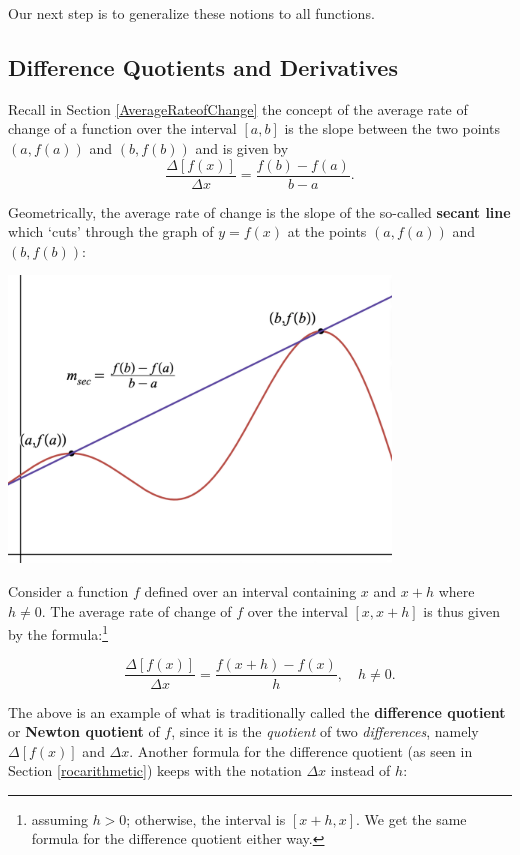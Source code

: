 \documentclass{ximera}
\begin{document}
Our next step is to generalize these notions to all functions.


\subsection{Difference Quotients and Derivatives}
\label{diffquotderiv}


Recall  in Section \ref{AverageRateofChange} the concept of the average rate of change of a function over the interval $[a,b]$  is the slope between the two points $(a, f(a))$ and $(b, f(b))$ and is given by \[ \dfrac{\Delta[f(x)]}{\Delta x} = \dfrac{f(b)-f(a)}{b-a}.\]

Geometrically, the average rate of change is the slope of the so-called \textbf{secant line} which `cuts' through the graph of $y = f(x)$ at the points $(a,f(a))$ and $(b, f(b))$:

\begin{center}
\includegraphics[width=4in]{./IntroductiontoDerivativesGraphics/SecantLine.png}
\end{center}

Consider a function $f$ defined over an interval containing $x$ and $x+h$ where $h \neq 0$. The average rate of change of $f$ over the interval $[x,x+h]$ is thus given by the formula:\footnote{assuming $h>0$;  otherwise,  the interval is $[x+h, x]$.  We get the same formula for the difference quotient either way.}

\[ \dfrac{\Delta[f(x)]}{\Delta x} = \dfrac{f(x+h)-f(x)}{h}, \quad h \neq 0.\]

The above is an example of what is traditionally called the  \textbf{difference quotient}  or  \textbf{Newton quotient} of $f$, since it is the \textit{quotient} of two \textit{differences}, namely $\Delta[f(x)]$ and $\Delta x$. Another formula for the difference quotient (as seen in Section \ref{rocarithmetic}) keeps with the notation $\Delta x$ instead of $h$:
\end{document}
